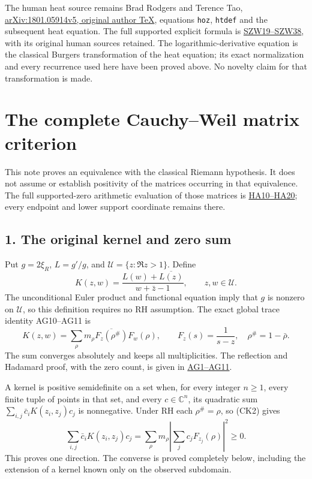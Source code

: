 \documentclass[
  10pt,
  a4paper,
]{article}
\begin{document}
The human heat source remains Brad Rodgers and Terence Tao,
\href{https://arxiv.org/src/1801.05914v5}{arXiv:1801.05914v5, original
author TeX}, equations \texttt{hoz}, \texttt{htdef} and the subsequent
heat equation. The full supported explicit formula is
\href{https://github.com/KokunoYumeto/zeta-function-research-reader/blob/3c022a0adde0a6aa3d8fc8e43ef42795d88e44b0/workbenches/splitzero-tandem/branches/tau-zero-prime-positivity/SUPPORTED_ZERO_PRIME_WEIL_DERIVATION.md}{SZW19--SZW38},
with its original human sources retained. The logarithmic-derivative
equation is the classical Burgers transformation of the heat equation;
its exact normalization and every recurrence used here have been proved
above. No novelty claim for that transformation is made.

\clearpage

\section{The complete Cauchy--Weil matrix
criterion}\label{the-complete-cauchyweil-matrix-criterion}

This note proves an equivalence with the classical Riemann hypothesis.
It does not assume or establish positivity of the matrices occurring in
that equivalence. The full supported-zero arithmetic evaluation of those
matrices is \href{HEAT_CAUCHY_ARITHMETIC_DERIVATION.md}{HA10--HA20};
every endpoint and lower support coordinate remains there.

\subsection{1. The original kernel and zero
sum}\label{the-original-kernel-and-zero-sum}

Put \(g=2\xi_R\), \(L=g'/g\), and \(\mathcal U=\{z:\Re z>1\}\). Define
\[
K(z,w)=\frac{L(w)+\overline{L(z)}}{w+\bar z-1},\qquad z,w\in\mathcal U.
\tag{CK1}
\] The unconditional Euler product and functional equation imply that
\(g\) is nonzero on \(\mathcal U\), so this definition requires no RH
assumption. The exact global trace identity AG10--AG11 is \[
K(z,w)=\sum_\rho m_\rho
\overline{F_z(\rho^\#)}F_w(\rho),\qquad
F_z(s)=\frac1{s-z},\quad\rho^\#=1-\bar\rho.
\tag{CK2}
\] The sum converges absolutely and keeps all multiplicities. The
reflection and Hadamard proof, with the zero count, is given in
\href{ACTUAL_HEAT_ZERO_DISTRIBUTION_VARIATION.md}{AG1--AG11}.

A kernel is positive semidefinite on a set when, for every integer
\(n\ge1\), every finite tuple of points in that set, and every
\(c\in\mathbb C^n\), its quadratic sum
\(\sum_{i,j}\bar c_iK(z_i,z_j)c_j\) is nonnegative. Under RH each
\(\rho^\#=\rho\), so (CK2) gives \[
\sum_{i,j}\bar c_iK(z_i,z_j)c_j
=\sum_\rho m_\rho\left|\sum_j c_jF_{z_j}(\rho)\right|^2\ge0.
\tag{CK3}
\] This proves one direction. The converse is proved completely below,
including the extension of a kernel known only on the observed
subdomain.
\end{document}
